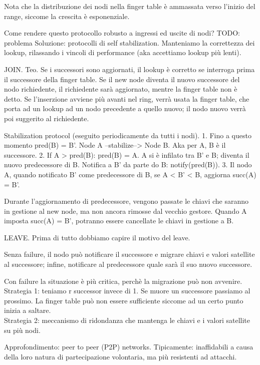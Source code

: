 Nota che la distribuzione dei nodi nella finger table è ammassata verso l'inizio del range, siccome la crescita è esponenziale.

Come rendere questo protocollo robusto a ingressi ed uscite di nodi?
TODO: problema
Soluzione: protocolli di self stabilization. Manteniamo la correttezza dei lookup, rilassando i vincoli di performance (aka accettiamo lookup
più lenti).

JOIN.
Teo. Se i successori sono aggiornati, il lookup è corretto se interroga prima il successore della finger table.
Se il new node diventa il nuovo successore del nodo richiedente, il richiedente sarà aggiornato, mentre la finger table non è detto.
Se l'inserzione avviene più avanti nel ring, verrà usata la finger table, che porta ad un lookup ad un nodo precedente a quello nuovo;
il nodo nuovo verrà poi suggerito al richiedente.

Stabilization protocol (eseguito periodicamente da tutti i nodi).
1. Fino a questo momento pred(B) = B'. Node A --stabilize--> Node B. Aka per A, B è il successore.
2. If A > pred(B): pred(B) = A. A si è infilato tra B' e B; diventa il nuovo predecessore di B. Notifica a B' da parte do B: notify(pred(B)).
3. Il nodo A, quando notificato B' come predecessore di B, se A < B' < B, aggiorna succ(A) = B'.

Durante l'aggiornamento di predecessore, vengono passate le chiavi che saranno in gestione al new node, ma non ancora rimosse dal vecchio gestore.
Quando A imposta succ(A) = B', potranno essere cancellate le chiavi in gestione a B.

LEAVE.
Prima di tutto dobbiamo capire il motivo del leave.

Senza failure, il nodo può notificare il successore e migrare chiavi e valori satellite al successore; infine, notificare al predecessore
quale sarà il suo nuovo successore.

Con failure la situazione è più critica, perchè la migrazione può non avvenire.
Strategia 1: teniamo r successor invece di 1. Se muore un successore passiamo al prossimo. La finger table può non essere sufficiente siccome 
ad un certo punto inizia a saltare. \\
Strategia 2: meccanismo di ridondanza che mantenga le chiavi e i valori satellite su più nodi.

Approfondimento: peer to peer (P2P) networks.
Tipicamente: inaffidabili a causa della loro natura di partecipazione volontaria, ma più resistenti ad attacchi.